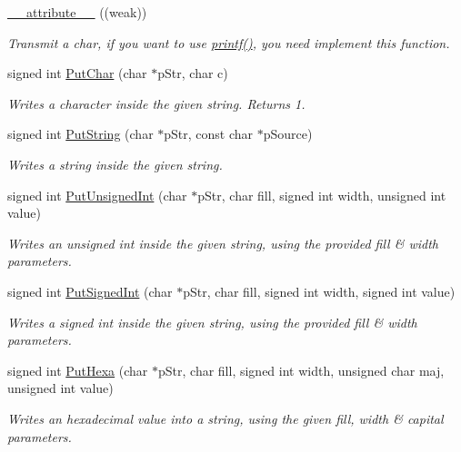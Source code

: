 \begin{DoxyCompactItemize}
\item 
\hyperlink{group__printf_gaf9aace1b44b73111e15aa39f06f43456}{\+\_\+\+\_\+attribute\+\_\+\+\_\+} ((weak))
\begin{DoxyCompactList}\small\item\em Transmit a char, if you want to use \hyperlink{group__printf_gad6c265f6d41266cbb62035915f9c0030}{printf()}, you need implement this function. \end{DoxyCompactList}\item 
signed int \hyperlink{group__printf_ga9d6957a52d69935cd92755844e9252be}{Put\+Char} (char $\ast$p\+Str, char c)
\begin{DoxyCompactList}\small\item\em Writes a character inside the given string. Returns 1. \end{DoxyCompactList}\item 
signed int \hyperlink{group__printf_ga9692c423423d4787d69f090a359c5644}{Put\+String} (char $\ast$p\+Str, const char $\ast$p\+Source)
\begin{DoxyCompactList}\small\item\em Writes a string inside the given string. \end{DoxyCompactList}\item 
signed int \hyperlink{group__printf_gafeda5b1cd1c8e201b2fc997b35d03281}{Put\+Unsigned\+Int} (char $\ast$p\+Str, char fill, signed int width, unsigned int value)
\begin{DoxyCompactList}\small\item\em Writes an unsigned int inside the given string, using the provided fill \& width parameters. \end{DoxyCompactList}\item 
signed int \hyperlink{group__printf_gae7337166e7d8bcc7d589e63777ae2541}{Put\+Signed\+Int} (char $\ast$p\+Str, char fill, signed int width, signed int value)
\begin{DoxyCompactList}\small\item\em Writes a signed int inside the given string, using the provided fill \& width parameters. \end{DoxyCompactList}\item 
signed int \hyperlink{group__printf_ga3b3bdb18a334228eb2b08b1a70c1a62a}{Put\+Hexa} (char $\ast$p\+Str, char fill, signed int width, unsigned char maj, unsigned int value)
\begin{DoxyCompactList}\small\item\em Writes an hexadecimal value into a string, using the given fill, width \& capital parameters. \end{DoxyCompactList}\item 

\end{DoxyCompactItemize}
